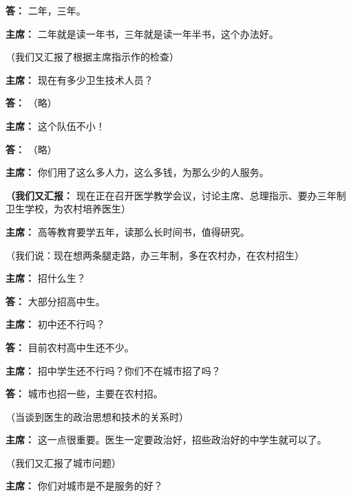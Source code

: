 \begin{list}{}
\item[\textbf{答：}] 二年，三年。

\item[\textbf{主席：}] 二年就是读一年书，三年就是读一年半书，这个办法好。

（我们又汇报了根据主席指示作的检查）

\item[\textbf{主席：}] 现在有多少卫生技术人员？

\item[\textbf{答：}] （略）

\item[\textbf{主席：}] 这个队伍不小！

\item[\textbf{答：}] （略）

\item[\textbf{主席：}] 你们用了这么多人力，这么多钱，为那么少的人服务。

\item[\textbf{（我们又汇报：}] 现在正在召开医学教学会议，讨论主席、总理指示、要办三年制卫生学校，为农村培养医生）

\item[\textbf{主席：}] 高等教育要学五年，读那么长时间书，值得研究。

（我们说：现在想两条腿走路，办三年制，多在农村办，在农村招生）

\item[\textbf{主席：}] 招什么生？

\item[\textbf{答：}] 大部分招高中生。

\item[\textbf{主席：}] 初中还不行吗？

\item[\textbf{答：}] 目前农村高中生还不少。

\item[\textbf{主席：}] 招中学生还不行吗？你们不在城市招了吗？

\item[\textbf{答：}] 城市也招一些，主要在农村招。

（当谈到医生的政治思想和技术的关系时）

\item[\textbf{主席：}] 这一点很重要。医生一定要政治好，招些政治好的中学生就可以了。

（我们又汇报了城市问题）

\item[\textbf{主席：}] 你们对城市是不是服务的好？


\end{list}
